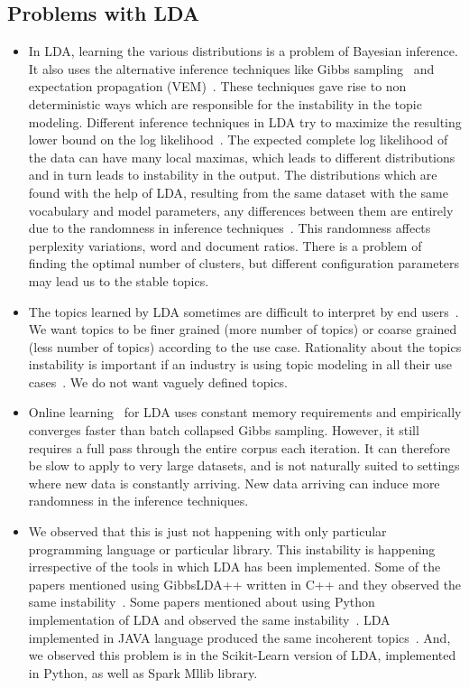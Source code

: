 \documentclass[conference]{IEEEtran}
\theoremstyle{break}
\begin{document}
\subsection{Problems with LDA}
\label{sect: problems}

\begin{itemize}
    \item In LDA, learning the various distributions is a problem of Bayesian inference. It also uses the alternative inference techniques like Gibbs sampling~\cite{wei2006lda, griffiths2004finding} and expectation propagation (VEM)~\cite{minka2002expectation}. These techniques gave rise to non deterministic ways which are responsible for the instability in the topic modeling. Different inference techniques in LDA try to maximize the resulting lower bound on the log likelihood~\cite{blei2003latent}. The expected complete log likelihood of the data can have many local maximas, which leads to different distributions and in turn leads to instability in the output. The distributions which are found with the help of LDA, resulting from the same dataset with the same vocabulary and model parameters, any differences between them are entirely due to the randomness in inference techniques~\cite{koltcov2014latent}. This randomness affects perplexity variations, word and document ratios. There is a problem of finding the optimal number of clusters, but different configuration parameters may lead us to the stable topics.
    \item The topics learned by LDA sometimes are difficult to interpret by end users~\cite{yang2015improving, panichella2013effectively}. We want topics to be finer grained (more number of topics) or coarse grained (less number of topics) according to the use case. Rationality about the topics instability is important if an industry is using topic modeling in all their use cases~\cite{lau2014machine, o2015analysis}. We do not want vaguely defined topics.
    \item Online learning~\cite{hoffman2010online} for LDA uses constant memory requirements and empirically converges faster than batch collapsed Gibbs sampling. However, it still requires a full pass through the entire corpus each iteration. It can therefore be slow to apply to very large datasets, and is not naturally suited to settings where new data is constantly arriving. New data arriving can induce more randomness in the inference techniques.
    \item We observed that this is just not happening with only particular programming language or particular library. This instability is happening irrespective of the tools in which LDA has been implemented. Some of the papers mentioned using GibbsLDA++ written in C++ and they observed the same instability~\cite{lukins2008source, tian2009using, guzman2014users}. Some papers mentioned about using Python implementation of LDA and observed the same instability~\cite{guzman2014users}. LDA implemented in JAVA language produced the same incoherent topics~\cite{martin2015app, hindle2011automated}. And, we observed this problem is in the Scikit-Learn version of LDA, implemented in Python, as well as Spark Mllib library.
\end{itemize}
\end{document}

